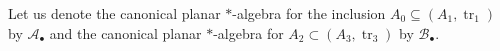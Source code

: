 \documentclass[11pt]{article}
\theoremstyle{plain}
\newtheorem{cor}[thm]{Corollary}
\theoremstyle{definition}
\DeclareMathOperator{\tr}{tr}
\newcommand{\set}[2]{\left\{#1 \middle| #2\right\}}
\newcommand{\nn}[1]{\textcolor{red}{[[#1]]}}
\newcommand{\roundNbox}[6]{
 \draw[rounded corners=5pt, very thick, #1] ($#2+(-#3,-#3)+(-#4,0)$) rectangle ($#2+(#3,#3)+(#5,0)$);
 \coordinate (ZZa) at ($#2+(-#4,0)$);
 \coordinate (ZZb) at ($#2+(#5,0)$);
 \node at ($1/2*(ZZa)+1/2*(ZZb)$) {#6};
}
\begin{document}
%
%
%

Let us denote the canonical planar $\ast$-algebra for the inclusion $A_0 \subseteq (A_1,\tr_1)$ by $\mathcal{A}_{\bullet}$ and the canonical planar $\ast$-algebra for $A_2 \subset (A_3,\tr_3)$ by $\mathcal{B}_{\bullet}$.
\end{document}
